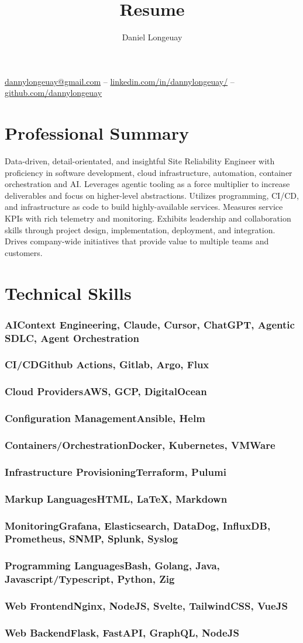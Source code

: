 \documentclass[letterpaper,11pt]{article}
\makeatletter
\renewcommand{\maketitle}{
  \begin{center}
    {\huge\bfseries\theauthor}

    \vspace{.25em}

    {\href{mailto:dannylongeuay@gmail.com}{dannylongeuay@gmail.com} -- \href{https://www.linkedin.com/in/dannylongeuay/}{linkedin.com/in/dannylongeuay/} -- \href{https://github.com/dannylongeuay}{github.com/dannylongeuay}}
  \end{center}
}
\newcommand{\skill}[2]{\subsubsection{\hspace{.5em}#1\hfill\mdseries#2}\vspace{-.5em}}
\makeatother
\begin{document}
\title{Resume}
\author{Daniel Longeuay}

\maketitle

\section{Professional Summary}

Data-driven, detail-orientated, and insightful Site Reliability Engineer with proficiency in software
development, cloud infrastructure, automation, container orchestration and AI. Leverages agentic tooling as
a force multiplier to increase deliverables and focus on higher-level abstractions. Utilizes programming, CI/CD,
and infrastructure as code to build highly-available services. Measures service KPIs with rich telemetry
and monitoring. Exhibits leadership and collaboration skills through project design, implementation, 
deployment, and integration. Drives company-wide initiatives that provide value to multiple teams and customers.

\section{Technical Skills}

  \skill{AI}{Context Engineering, Claude, Cursor, ChatGPT, Agentic SDLC, Agent Orchestration}

  \skill{CI/CD}{Github Actions, Gitlab, Argo, Flux}

  \skill{Cloud Providers}{AWS, GCP, DigitalOcean}

  \skill{Configuration Management}{Ansible, Helm}

  \skill{Containers/Orchestration}{Docker, Kubernetes, VMWare}

  \skill{Infrastructure Provisioning}{Terraform, Pulumi}

  \skill{Markup Languages}{HTML, {\LaTeX}, Markdown}

  \skill{Monitoring}{Grafana, Elasticsearch, DataDog, InfluxDB, Prometheus, SNMP, Splunk, Syslog}

  \skill{Programming Languages}{Bash, Golang, Java, Javascript/Typescript, Python, Zig}

  \skill{Web Frontend}{Nginx, NodeJS, Svelte, TailwindCSS, VueJS}

  \skill{Web Backend}{Flask, FastAPI, GraphQL, NodeJS}
\end{document}

